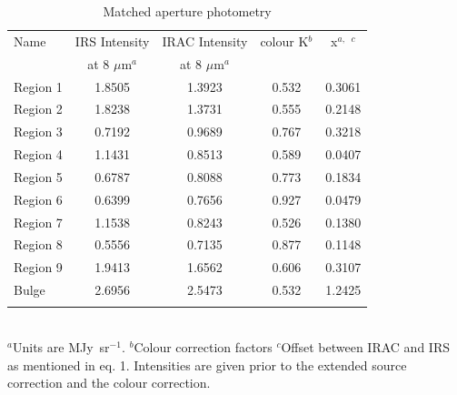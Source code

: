 \begin{table}
 \centering
 \begin{minipage}{90mm}
\caption{Matched aperture photometry}
  \begin{tabular}{lcccc}
  \hline{Name}&{IRS Intensity}&{IRAC Intensity}&{colour K$^b$}&{x$^{a,}$ $^c$} \\ {}&{at 8 $\mu$m$^a$}&{at 8 $\mu$m$^a$}&{}&{} 
   \\
 \hline
 Region 1 & 1.8505 & 1.3923 & 0.532 & 0.3061
 \\ Region 2  & 1.8238 & 1.3731 & 0.555 & 0.2148
 \\ Region 3 & 0.7192 & 0.9689 & 0.767 & 0.3218
 \\ Region 4 & 1.1431 & 0.8513 & 0.589 & 0.0407
 \\  Region 5 & 0.6787 & 0.8088 & 0.773 & 0.1834
 \\  Region 6  & 0.6399 & 0.7656 & 0.927 & 0.0479
 \\  Region 7  & 1.1538 & 0.8243 & 0.526 & 0.1380
 \\ Region 8 & 0.5556 & 0.7135 & 0.877 & 0.1148
 \\  Region 9 & 1.9413 & 1.6562 & 0.606 & 0.3107 
 \\ Bulge & 2.6956 & 2.5473 & 0.532 & 1.2425\\
\hline
 \label{colourK}
\end{tabular}\\
 {$^a$Units are MJy~sr$^{-1}$. 
 $^b$Colour correction factors 
 $^c$Offset between IRAC and IRS as mentioned in eq. 1. Intensities are given prior to the extended source correction and the colour correction.}
\end{minipage}
\end{table}


